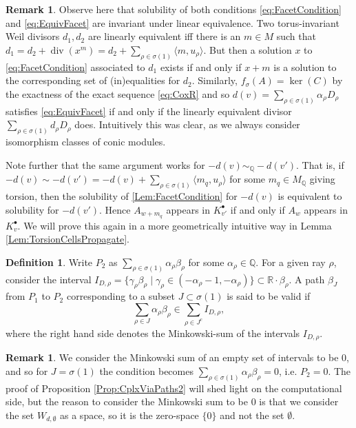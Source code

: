 \documentclass[reqno, 12pt]{amsart}
\theoremstyle{definition}
\newtheorem{definition}[theorem]{Definition}
\newtheorem{remark}[theorem]{Remark}
\numberwithin{equation}{section}
\newcommand{\newterm}{\textsf}
\newcommand{\R}{\mathbb{R}}
\newcommand{\Q}{\mathbb{Q}}
\begin{document}
\begin{remark}
\label{Rem:LinEquivFacet}
Observe here that solubility of both conditions \eqref{eq:FacetCondition} and \eqref{eq:EquivFacet} are invariant under linear equivalence. Two torus-invariant Weil divisors $d_1, d_2$ are linearly equivalent iff there is an $m\in M$ such that $d_1=d_2+\operatorname{div}(x^m)=d_2+\sum_{\rho\in\sigma(1)}\langle m,u_\rho\rangle$. But then a solution $x$ to \eqref{eq:FacetCondition} associated to $d_1$ exists if and only if $x+m$ is a solution to the corresponding set of (in)equalities for $d_2$. Similarly, $f_\sigma(A)=\ker(C)$ by the exactness of the exact sequence \eqref{eq:CoxR} and so $d(v)=\sum_{\rho\in \sigma(1)}\alpha_\rho D_\rho$ satisfies \eqref{eq:EquivFacet} if and only if the linearly equivalent divisor $\sum_{\rho\in \sigma(1)}d_\rho D_\rho$ does. Intuitively this was clear, as we always consider isomorphism classes of conic modules. 


\noindent Note further that the same argument works for $-d(v)\sim_\Q -d(v')$. That is, if $-d(v)\sim -d(v')=-d(v)+\sum_{\rho\in \sigma(1)}\langle m_q,u_\rho\rangle$ for some $m_q\in M_\Q$ giving torsion, then the solubility of \eqref{Lem:FacetCondition} for $-d(v)$ is equivalent to solubility for $-d(v')$. Hence $A_{w+m_q}$ appears in $K_{v'}^\bullet$ if and only if $A_w$ appears in $K_v^\bullet$. We will prove this again in a more geometrically intuitive way in Lemma \ref{Lem:TorsionCellsPropagate}. 
\end{remark} 


\begin{definition}
    Write $P_2$ as $\sum_{\rho\in \sigma(1)}\alpha_\rho\beta_\rho$ for some $\alpha_\rho\in \Q$. For a given ray $\rho$, consider the interval $I_{D,\rho}=\{\gamma_\rho\beta_\rho\mid \gamma_\rho\in (-\alpha_\rho-1,-\alpha_\rho)\}\subset \R\cdot \beta_\rho$.
    A path $\beta_J$ from $P_1$ to $P_2$ corresponding to a subset $J\subset \sigma(1)$ is said to be \newterm{valid} if \begin{equation}
        \label{eq:ValidPath}
        \sum_{\rho\in J}\alpha_\rho\beta_\rho\in \sum_{\rho\in J^c}I_{D,\rho},
    \end{equation}
    where the right hand side denotes the Minkowski-sum of the intervals $I_{D,\rho}$.
\end{definition}
\begin{remark}
    We consider the Minkowski sum of an empty set of intervals to be 0, and so for $J=\sigma(1)$ the condition becomes $\sum_{\rho\in \sigma(1)}\alpha_\rho\beta_\rho=0$, i.e. $P_2=0$. The proof of Proposition \ref{Prop:CplxViaPaths2} will shed light on the computational side, but the reason to consider the Minkowski sum to be 0 is that we consider the set $W_{d,\emptyset}$ as a space, so it is the zero-space $\{0\}$ and not the set $\emptyset$.
\end{remark}
\end{document}

